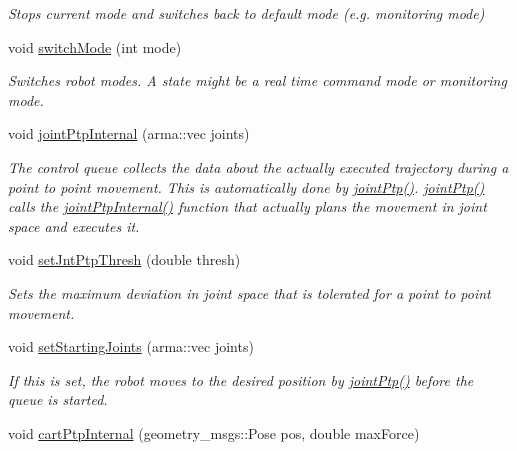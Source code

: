 \begin{DoxyCompactItemize}
\begin{DoxyCompactList}\small\item\em Stops current mode and switches back to default mode (e.\+g. monitoring mode) \end{DoxyCompactList}\item 
void \hyperlink{classkukadu_1_1PlottingControlQueue_ace69c9adaff27b5d98a42e70f7bc64ff}{switch\+Mode} (int mode)
\begin{DoxyCompactList}\small\item\em Switches robot modes. A state might be a real time command mode or monitoring mode. \end{DoxyCompactList}\item 
void \hyperlink{classkukadu_1_1PlottingControlQueue_aa7ce40e835eeccff82acafea0f069c83}{joint\+Ptp\+Internal} (arma\+::vec joints)\hypertarget{classkukadu_1_1PlottingControlQueue_aa7ce40e835eeccff82acafea0f069c83}{}\label{classkukadu_1_1PlottingControlQueue_aa7ce40e835eeccff82acafea0f069c83}

\begin{DoxyCompactList}\small\item\em The control queue collects the data about the actually executed trajectory during a point to point movement. This is automatically done by \hyperlink{classkukadu_1_1ControlQueue_ad11059100321b24a1af8ef7de8314353}{joint\+Ptp()}. \hyperlink{classkukadu_1_1ControlQueue_ad11059100321b24a1af8ef7de8314353}{joint\+Ptp()} calls the \hyperlink{classkukadu_1_1PlottingControlQueue_aa7ce40e835eeccff82acafea0f069c83}{joint\+Ptp\+Internal()} function that actually plans the movement in joint space and executes it. \end{DoxyCompactList}\item 
void \hyperlink{classkukadu_1_1PlottingControlQueue_a32b42bcaf1a674c41449ddec692a2dfa}{set\+Jnt\+Ptp\+Thresh} (double thresh)
\begin{DoxyCompactList}\small\item\em Sets the maximum deviation in joint space that is tolerated for a point to point movement. \end{DoxyCompactList}\item 
void \hyperlink{classkukadu_1_1PlottingControlQueue_a16154678068808ba8989012f044f4a5e}{set\+Starting\+Joints} (arma\+::vec joints)
\begin{DoxyCompactList}\small\item\em If this is set, the robot moves to the desired position by \hyperlink{classkukadu_1_1ControlQueue_ad11059100321b24a1af8ef7de8314353}{joint\+Ptp()} before the queue is started. \end{DoxyCompactList}\item 
void \hyperlink{classkukadu_1_1PlottingControlQueue_afb803b02a1c0f0d7270910583c3d839b}{cart\+Ptp\+Internal} (geometry\+\_\+msgs\+::\+Pose pos, double max\+Force)\hypertarget{classkukadu_1_1PlottingControlQueue_afb803b02a1c0f0d7270910583c3d839b}{}\label{classkukadu_1_1PlottingControlQueue_afb803b02a1c0f0d7270910583c3d839b}


\end{DoxyCompactItemize}
